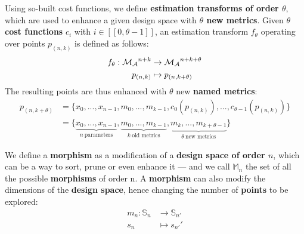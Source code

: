             Using so-built cost functions, we define {\bf estimation transforms of order $\theta$}, which are used to enhance a given design space with {\bf $\theta$ new metrics}.
            Given {\bf $\theta$ cost functions} $c_i$ with $i \in [\![0, \theta-1]\!]$, an estimation transform $f_\theta$ operating over points $p_{(n, k)}$ is defined as follows:
            \begin{equation}
                \label{ch.dse:sec.functional:ssec.formalization:eq.estimationTransform}
                \begin{split}
                    f_\theta: {\cal{M}_{\cal{A}}}^{n+k} & \rightarrow {\cal{M}_{\cal{A}}}^{n+k+\theta}\\
                    p_{(n, k)} & \mapsto p_{(n, k + \theta)}
                \end{split}
            \end{equation}
            The resulting points are thus enhanced with $\theta$ new {\bf named metrics}:
            \begin{equation}
                \label{ch.dse:sec.functional:ssec.formalization:eq.enhancedPoint}
                \begin{split}
                    p_{(n, k + \theta)} &= \{x_0, ..., x_{n-1}, m_0, ..., m_{k-1}, c_0(p_{(n, k)}), ..., c_{\theta-1}(p_{(n, k)})\}\\
                                       &= \{\underbrace{x_0, ..., x_{n-1}}_{n\: \text{parameters}}, \underbrace{m_0, ..., m_{k-1}}_{k\: \text{old metrics}}, \underbrace{m_k, ..., m_{k+\theta-1}}_{\theta\: \text{new metrics}}\}
                \end{split}
            \end{equation}


            We define a {\bf morphism} as a modification of a {\bf design space of order $n$}, which can be a way to sort, prune or even enhance it --- and we call $\mathbb{M}_n$ the set of all the possible {\bf morphisms} of order n.
            A {\bf morphism} can also modify the dimensions of the {\bf design space}, hence changing the number of {\bf points} to be explored:
            \begin{equation}
                \label{ch.dse:sec.functional:ssec.formalization:eq.morphism}
                \begin{split}
                    m_n: \mathbb{S}_n & \rightarrow \mathbb{S}_{n'}\\
                    s_n & \mapsto s_{n'}'
                \end{split}
            \end{equation}

